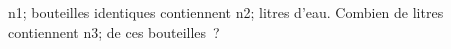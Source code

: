 \documentclass[exercice]{thedocument}%
\begin{document}
%
\<n1; bouteilles identiques contiennent \<n2; litres d'eau.\vskip10pt
Combien de litres contiennent \<n3; de ces bouteilles~?
\end{document}

